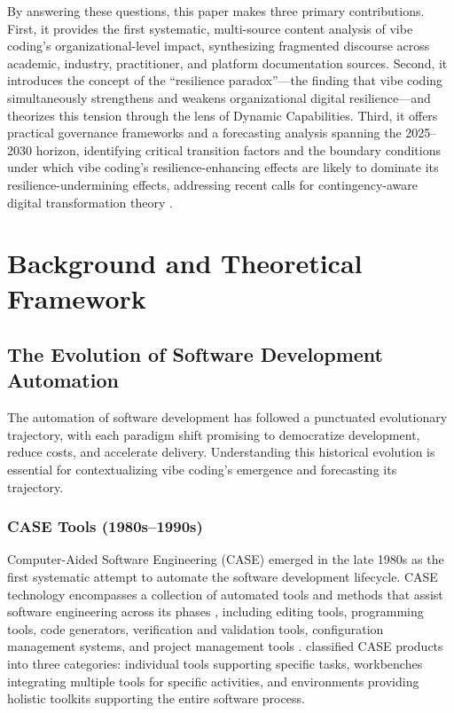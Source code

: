 \documentclass[preprint,12pt,authoryear]{elsarticle}
\begin{document}
By answering these questions, this paper makes three primary contributions. First, it provides the first systematic, multi-source content analysis of vibe coding's organizational-level impact, synthesizing fragmented discourse across academic, industry, practitioner, and platform documentation sources. Second, it introduces the concept of the ``resilience paradox''---the finding that vibe coding simultaneously strengthens and weakens organizational digital resilience---and theorizes this tension through the lens of Dynamic Capabilities. Third, it offers practical governance frameworks and a forecasting analysis spanning the 2025--2030 horizon, identifying critical transition factors and the boundary conditions under which vibe coding's resilience-enhancing effects are likely to dominate its resilience-undermining effects, addressing recent calls for contingency-aware digital transformation theory \citep{Hanelt2021, Verhoef2021}.


\section{Background and Theoretical Framework}
\label{sec:background}

\subsection{The Evolution of Software Development Automation}

The automation of software development has followed a punctuated evolutionary trajectory, with each paradigm shift promising to democratize development, reduce costs, and accelerate delivery. Understanding this historical evolution is essential for contextualizing vibe coding's emergence and forecasting its trajectory.

\subsubsection{CASE Tools (1980s--1990s)}

Computer-Aided Software Engineering (CASE) emerged in the late 1980s as the first systematic attempt to automate the software development lifecycle. CASE technology encompasses a collection of automated tools and methods that assist software engineering across its phases \citep{Sommerville1996, Fuggetta1993}, including editing tools, programming tools, code generators, verification and validation tools, configuration management systems, and project management tools \citep{Fuggetta1993}. \citet{Fuggetta1993} classified CASE products into three categories: individual tools supporting specific tasks, workbenches integrating multiple tools for specific activities, and environments providing holistic toolkits supporting the entire software process.
\end{document}
